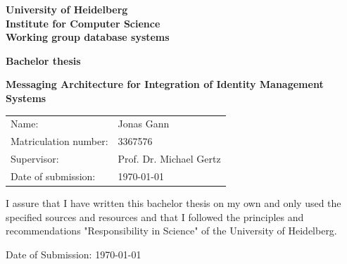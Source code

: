 \documentclass[
     12pt,         %
     a4paper,      %
     BCOR=10mm,version=first,     %
     DIV=14,version=first,        %
     ]{scrreprt}
\begin{document}
\begin{titlepage}
     \vspace*{1cm}
     \begin{center}
          \vspace*{3cm}
          \textbf
          {
               \Large University of Heidelberg\\
               \smallskip
               \Large Institute for Computer Science\\
               \smallskip
               \Large Working group database systems\\
               \smallskip
          }

          \vspace{3cm}

          \textbf{\large Bachelor thesis}

          \vspace{0.5\baselineskip}
          {
               \huge
               \textbf{Messaging Architecture for Integration of Identity Management Systems}
          }

     \end{center}

     \vfill
     {
          \large
          \begin{tabular}[l]{ll}
               Name:                 & Jonas Gann              \\
               Matriculation number: & 3367576                 \\
               Supervisor:           & Prof. Dr. Michael Gertz \\
               Date of submission:   & \today
          \end{tabular}
     }

\end{titlepage}

\onehalfspacing

\thispagestyle{empty}

\vspace*{100pt}
\noindent
I assure that I have written this bachelor thesis on my own and only used the specified sources and resources and that I followed the principles and recommendations "Responsibility in Science" of the University of Heidelberg.

\vspace*{50pt}
\noindent

\underline{\phantom{mmmmmmmmmmmmmmmmmmmm}}

\medskip
\noindent
Date of Submission: \today
\newpage
\end{document}
